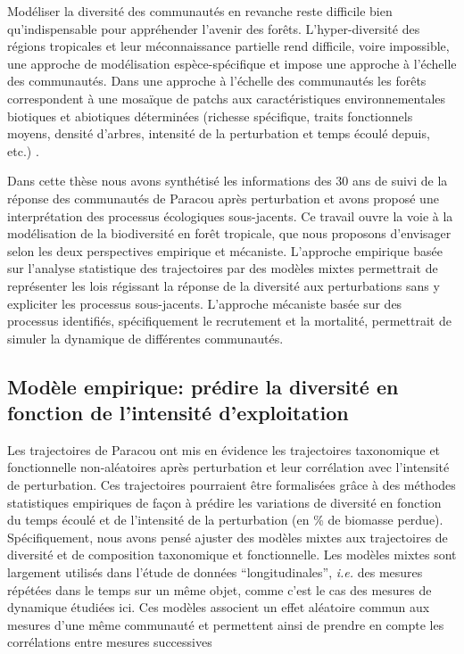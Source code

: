 \documentclass[
  11pt,
  french,
  A4paper,
  extrafontsizes,onecolumn,openright
  ]{memoir}
\begin{document}
Modéliser la diversité des communautés en revanche reste difficile bien
qu'indispensable pour appréhender l'avenir des forêts. L'hyper-diversité
des régions tropicales et leur méconnaissance partielle rend difficile,
voire impossible, une approche de modélisation espèce-spécifique et
impose une approche à l'échelle des communautés. Dans une approche à
l'échelle des communautés les forêts correspondent à une mosaïque de
patchs aux caractéristiques environnementales biotiques et abiotiques
déterminées (richesse spécifique, traits fonctionnels moyens, densité
d'arbres, intensité de la perturbation et temps écoulé depuis, etc.)
\autocite{Porte2002}.

Dans cette thèse nous avons synthétisé les informations des 30 ans de
suivi de la réponse des communautés de Paracou après perturbation et
avons proposé une interprétation des processus écologiques sous-jacents.
Ce travail ouvre la voie à la modélisation de la biodiversité en forêt
tropicale, que nous proposons d'envisager selon les deux perspectives
empirique et mécaniste. L'approche empirique basée sur l'analyse
statistique des trajectoires par des modèles mixtes permettrait de
représenter les lois régissant la réponse de la diversité aux
perturbations sans y expliciter les processus sous-jacents. L'approche
mécaniste basée sur des processus identifiés, spécifiquement le
recrutement et la mortalité, permettrait de simuler la dynamique de
différentes communautés.

\subsection{Modèle empirique: prédire la diversité en fonction de
l'intensité
d'exploitation}\label{modele-empirique-predire-la-diversite-en-fonction-de-lintensite-dexploitation}

Les trajectoires de Paracou ont mis en évidence les trajectoires
taxonomique et fonctionnelle non-aléatoires après perturbation et leur
corrélation avec l'intensité de perturbation. Ces trajectoires
pourraient être formalisées grâce à des méthodes statistiques empiriques
de façon à prédire les variations de diversité en fonction du temps
écoulé et de l'intensité de la perturbation (en \% de biomasse perdue).
Spécifiquement, nous avons pensé ajuster des modèles mixtes aux
trajectoires de diversité et de composition taxonomique et
fonctionnelle. Les modèles mixtes sont largement utilisés dans l'étude
de données ``longitudinales'', \emph{i.e.} des mesures répétées dans le
temps sur un même objet, comme c'est le cas des mesures de dynamique
étudiées ici. Ces modèles associent un effet aléatoire commun aux
mesures d'une même communauté et permettent ainsi de prendre en compte
les corrélations entre mesures successives
\end{document}
